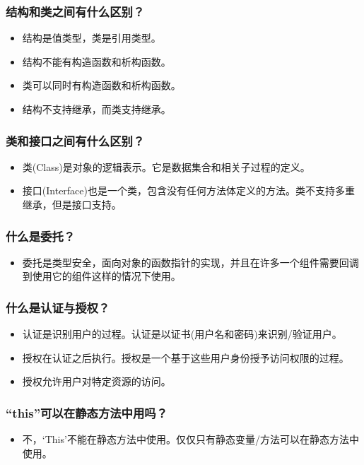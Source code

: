 \documentclass[9pt, b5paper]{article}
\begin{document}
\subsubsection{结构和类之间有什么区别？}
\label{sec-1-2-69}
\begin{itemize}
\item 结构是值类型，类是引用类型。
\item 结构不能有构造函数和析构函数。
\item 类可以同时有构造函数和析构函数。
\item 结构不支持继承，而类支持继承。
\end{itemize}
\subsubsection{类和接口之间有什么区别？}
\label{sec-1-2-70}
\begin{itemize}
\item 类(Class)是对象的逻辑表示。它是数据集合和相关子过程的定义。
\item 接口(Interface)也是一个类，包含没有任何方法体定义的方法。类不支持多重继承，但是接口支持。
\end{itemize}
\subsubsection{什么是委托？}
\label{sec-1-2-71}
\begin{itemize}
\item 委托是类型安全，面向对象的函数指针的实现，并且在许多一个组件需要回调到使用它的组件这样的情况下使用。
\end{itemize}
\subsubsection{什么是认证与授权？}
\label{sec-1-2-72}
\begin{itemize}
\item 认证是识别用户的过程。认证是以证书(用户名和密码)来识别/验证用户。
\item 授权在认证之后执行。授权是一个基于这些用户身份授予访问权限的过程。
\item 授权允许用户对特定资源的访问。
\end{itemize}
\subsubsection{“this”可以在静态方法中用吗？}
\label{sec-1-2-73}
\begin{itemize}
\item 不，‘This’不能在静态方法中使用。仅仅只有静态变量/方法可以在静态方法中使用。
\end{itemize}
\end{document}
